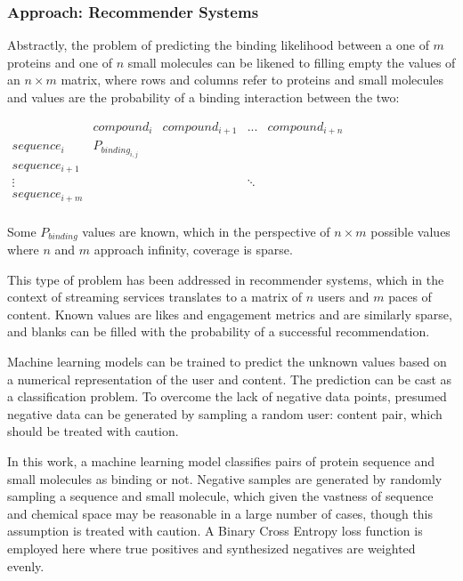 \documentclass{article}
\begin{document}
\subsubsection{Approach: Recommender Systems}

Abstractly, the problem of predicting the binding likelihood between a one of $m$ proteins and one of $n$ small molecules can be likened to filling empty the values of an $n \times m$ matrix, where rows and columns refer to proteins and small molecules and values are the probability of a binding interaction between the two:

\begin{center}
$
\begin{matrix} 
	 & compound_i & compound_{i+1} & ... & compound_{i+n} \\
	sequence_i  & P_{binding_{i,j}} &  &  & \\  
	sequence_{i+1} &  &  &  &  \\
	 \vdots &  &  & \ddots &  \\
	sequence_{i+m} &  &  &  &   \\
\end{matrix}
$
\end{center}

Some $P_{binding}$ values are known, which in the perspective of $n \times m$ possible values where $n$ and $m$ approach infinity, coverage is sparse.

This type of problem has been addressed in recommender systems, which in the context of streaming services translates to a matrix of $n$ users and $m$ paces of content.
Known values are likes and engagement metrics and are similarly sparse, and blanks can be filled with the probability of a successful recommendation.

Machine learning models can be trained to predict the unknown values based on a numerical representation of the user and content.
The prediction can be cast as a classification problem.
To overcome the lack of negative data points, presumed negative data can be generated by sampling a random user: content pair, which should be treated with caution.

In this work, a machine learning model classifies pairs of protein sequence and small molecules as binding or not.
Negative samples are generated by randomly sampling a sequence and small molecule, which given the vastness of sequence and chemical space may be reasonable in a large number of cases, though this assumption is treated with caution.
A Binary Cross Entropy loss function is employed here where true positives and synthesized negatives are weighted evenly.
\end{document}
